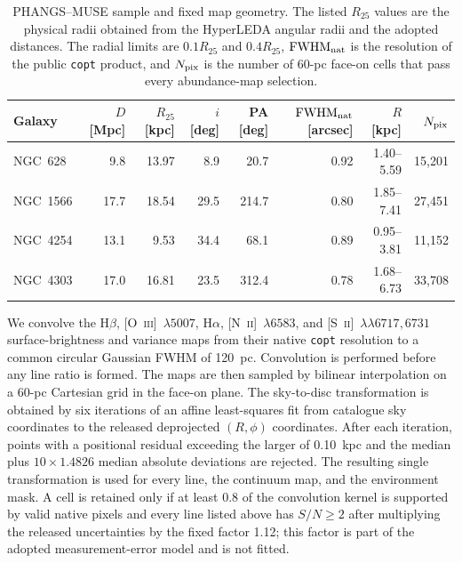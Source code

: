 \documentclass[fleqn,usenatbib]{mnras}
\begin{document}
\begin{table}
\centering
\caption{PHANGS--MUSE sample and fixed map geometry.  The listed $R_{25}$ values are the physical radii obtained from the HyperLEDA angular radii and the adopted distances.  The radial limits are $0.1R_{25}$ and $0.4R_{25}$, $\mathrm{FWHM}_{\rm nat}$ is the resolution of the public \texttt{copt} product, and $N_{\rm pix}$ is the number of 60-pc face-on cells that pass every abundance-map selection.}
\label{tab:phangs_sample}
\begin{tabular}{@{}lrrrrrrr@{}}
\toprule
Galaxy & $D$ [Mpc] & $R_{25}$ [kpc] & $i$ [deg] & PA [deg] & $\mathrm{FWHM}_{\rm nat}$ [arcsec] & $R$ [kpc] & $N_{\rm pix}$\\
\midrule
NGC~628  &  9.8 & 13.97 &  8.9 &  20.7 & 0.92 & 1.40--5.59 & 15,201\\
NGC~1566 & 17.7 & 18.54 & 29.5 & 214.7 & 0.80 & 1.85--7.41 & 27,451\\
NGC~4254 & 13.1 &  9.53 & 34.4 &  68.1 & 0.89 & 0.95--3.81 & 11,152\\
NGC~4303 & 17.0 & 16.81 & 23.5 & 312.4 & 0.78 & 1.68--6.73 & 33,708\\
\bottomrule
\end{tabular}
\end{table}

We convolve the H$\beta$, [O~\textsc{iii}]~$\lambda5007$, H$\alpha$, [N~\textsc{ii}]~$\lambda6583$, and [S~\textsc{ii}]~$\lambda\lambda6717,6731$ surface-brightness and variance maps from their native \texttt{copt} resolution to a common circular Gaussian FWHM of 120~pc.  Convolution is performed before any line ratio is formed.  The maps are then sampled by bilinear interpolation on a 60-pc Cartesian grid in the face-on plane.  The sky-to-disc transformation is obtained by six iterations of an affine least-squares fit from catalogue sky coordinates to the released deprojected $(R,\phi)$ coordinates.  After each iteration, points with a positional residual exceeding the larger of 0.10~kpc and the median plus $10\times1.4826$ median absolute deviations are rejected.  The resulting single transformation is used for every line, the continuum map, and the environment mask.  A cell is retained only if at least 0.8 of the convolution kernel is supported by valid native pixels and every line listed above has $S/N\geq2$ after multiplying the released uncertainties by the fixed factor 1.12; this factor is part of the adopted measurement-error model and is not fitted.
\end{document}
